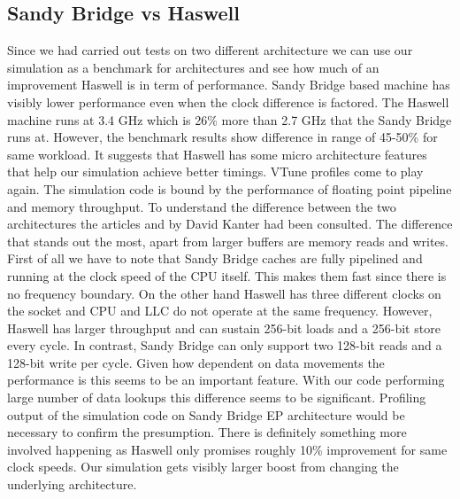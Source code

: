 \documentclass[12pt, a4paper]{report}
\begin{document}
\subsection{Sandy Bridge vs Haswell}\label{subsec:sb-vs-haswell}
Since we had carried out tests on two different architecture we can use our
simulation as a benchmark for architectures and see how much of an improvement
Haswell is in term of performance. Sandy Bridge based machine has visibly
lower performance even when the clock difference is factored. The Haswell
machine runs at 3.4 GHz which is 26\% more than 2.7 GHz that the Sandy Bridge
runs at. However, the benchmark results show difference in range of 45-50\%
for same workload. It suggests that Haswell has some micro architecture
features that help our simulation achieve better timings. VTune profiles
come to play again. The simulation code is bound by the performance
of floating point pipeline and memory throughput. To understand the difference
between the two architectures the articles \cite{SandyBridgeArch} and
\cite{HaswellArch} by David Kanter had been consulted. The difference that
stands out the most, apart from larger buffers are memory reads and writes.
First of all we have to note that Sandy Bridge caches are fully pipelined
and running at the clock speed of the CPU itself. This makes them fast since
there is no frequency boundary. On the other hand Haswell has three different
clocks on the socket and CPU and LLC do not operate at the same frequency.
However, Haswell has larger throughput and can sustain 256-bit loads and a
256-bit store every cycle. In contrast, Sandy Bridge can only support two
128-bit reads and a 128-bit write per cycle. Given how dependent on data
movements the performance is this seems to be an important feature. With our
code performing large number of data lookups this difference seems to be
significant. Profiling output of the simulation code on Sandy Bridge EP
architecture would be necessary to confirm the presumption. There is
definitely something more involved happening as Haswell only promises
roughly 10\% improvement for same clock speeds. Our simulation gets
visibly larger boost from changing the underlying architecture.
\end{document}
